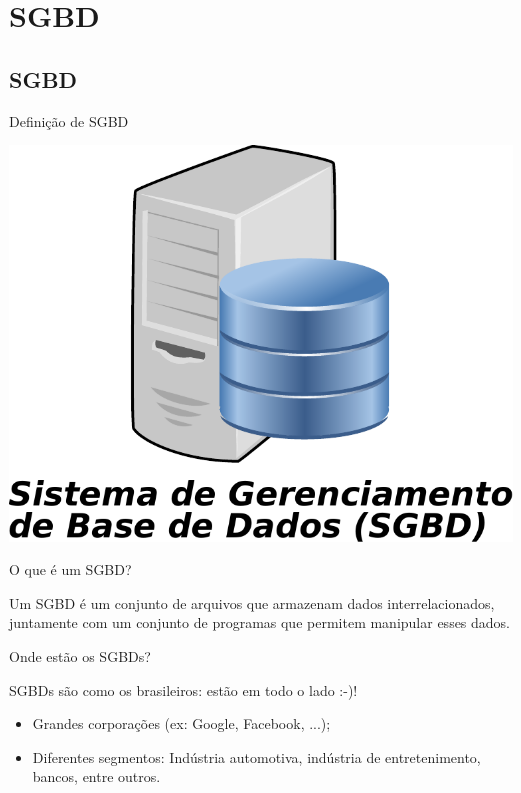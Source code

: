 \documentclass[xcolor=x11names,compress]{beamer}
\begin{document}
\section{SGBD}
\subsection{SGBD}
\begin{frame}{Definição de SGBD}

\begin{center}
\includegraphics[keepaspectratio,width=.4\textwidth]{database-server-sgbd}
\end{center}

\begin{alertblock}{O que é um SGBD?}

Um SGBD é um conjunto de arquivos que armazenam dados interrelacionados, juntamente com um conjunto de programas que permitem manipular esses dados.

\end{alertblock}
\end{frame}

\begin{frame}{Onde estão os SGBDs?}


SGBDs são como os brasileiros: estão em todo o lado :-)!

\vspace*{3mm}

\begin{itemize}
\itemsep	5mm
\item Grandes corporações (ex: Google, Facebook, ...);

\item Diferentes segmentos: Indústria automotiva, indústria de entretenimento, bancos, entre outros.

\end{itemize}


\end{frame}
\end{document}
